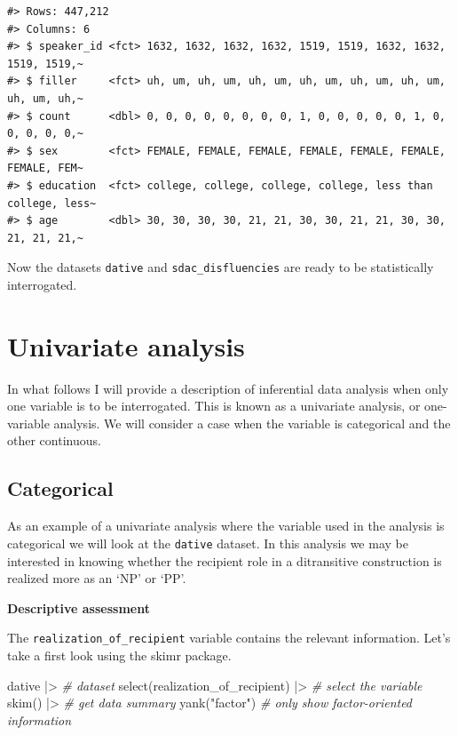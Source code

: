 \documentclass[
  letterpaper,
]{latex/krantz}
\newenvironment{Shaded}{\begin{snugshade}}{\end{snugshade}}
\newcommand{\CommentTok}[1]{\textcolor[rgb]{0.00,0.00,0.00}{\textit{#1}}}
\newcommand{\FunctionTok}[1]{\textcolor[rgb]{0.00,0.00,0.00}{#1}}
\newcommand{\NormalTok}[1]{\textcolor[rgb]{0.00,0.00,0.00}{#1}}
\newcommand{\SpecialCharTok}[1]{\textcolor[rgb]{0.00,0.00,0.00}{#1}}
\newcommand{\StringTok}[1]{\textcolor[rgb]{0.00,0.00,0.00}{#1}}
\begin{document}
\begin{verbatim}
#> Rows: 447,212
#> Columns: 6
#> $ speaker_id <fct> 1632, 1632, 1632, 1632, 1519, 1519, 1632, 1632, 1519, 1519,~
#> $ filler     <fct> uh, um, uh, um, uh, um, uh, um, uh, um, uh, um, uh, um, uh,~
#> $ count      <dbl> 0, 0, 0, 0, 0, 0, 0, 0, 1, 0, 0, 0, 0, 0, 1, 0, 0, 0, 0, 0,~
#> $ sex        <fct> FEMALE, FEMALE, FEMALE, FEMALE, FEMALE, FEMALE, FEMALE, FEM~
#> $ education  <fct> college, college, college, college, less than college, less~
#> $ age        <dbl> 30, 30, 30, 30, 21, 21, 30, 30, 21, 21, 30, 30, 21, 21, 21,~
\end{verbatim}

Now the datasets \texttt{dative} and \texttt{sdac\_disfluencies} are
ready to be statistically interrogated.

\hypertarget{univariate-analysis}{%
\section{Univariate analysis}\label{univariate-analysis}}

In what follows I will provide a description of inferential data
analysis when only one variable is to be interrogated. This is known as
a univariate analysis, or one-variable analysis. We will consider a case
when the variable is categorical and the other continuous.

\hypertarget{categorical}{%
\subsection{Categorical}\label{categorical}}

As an example of a univariate analysis where the variable used in the
analysis is categorical we will look at the \texttt{dative} dataset. In
this analysis we may be interested in knowing whether the recipient role
in a ditransitive construction is realized more as an `NP' or `PP'.

\textbf{Descriptive assessment}

The \texttt{realization\_of\_recipient} variable contains the relevant
information. Let's take a first look using the skimr package.

\begin{Shaded}
\begin{Highlighting}[]
\NormalTok{dative }\SpecialCharTok{|\textgreater{}} \CommentTok{\# dataset}
  \FunctionTok{select}\NormalTok{(realization\_of\_recipient) }\SpecialCharTok{|\textgreater{}} \CommentTok{\# select the variable}
  \FunctionTok{skim}\NormalTok{() }\SpecialCharTok{|\textgreater{}} \CommentTok{\# get data summary}
  \FunctionTok{yank}\NormalTok{(}\StringTok{"factor"}\NormalTok{) }\CommentTok{\# only show factor{-}oriented information}
\end{Highlighting}
\end{Shaded}
\end{document}

